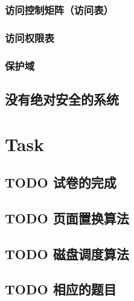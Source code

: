 \documentclass[11pt]{article}
\begin{document}
\subsubsection{访问控制矩阵（访问表）}
\label{sec-6-2-1}
\subsubsection{访问权限表}
\label{sec-6-2-2}
\subsubsection{保护域}
\label{sec-6-2-3}
\subsection{没有绝对安全的系统}
\label{sec-6-3}
\section{Task}
\label{sec-7}
\subsection{{\bfseries\sffamily TODO} 试卷的完成}
\label{sec-7-1}
\subsection{{\bfseries\sffamily TODO} 页面置换算法}
\label{sec-7-2}
\subsection{{\bfseries\sffamily TODO} 磁盘调度算法}
\label{sec-7-3}
\subsection{{\bfseries\sffamily TODO} 相应的题目}
\label{sec-7-4}
\end{document}
